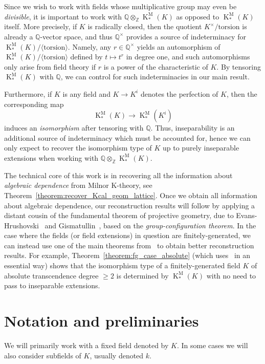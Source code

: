 \documentclass[12pt]{amsart}
\newcommand{\KM}{\operatorname{K}^\mathrm{M}}
\newcommand{\Zbb}{\mathbb{Z}}
\newcommand{\Qbb}{\mathbb{Q}}
\theoremstyle{definition}
\begin{document}
Since we wish to work with fields whose multiplicative group may even be \emph{divisible}, it is important to work with $\Qbb \otimes_{\Zbb} \KM_{*}(K)$ as opposed to $\KM_{*}(K)$ itself.
More precisely, if $K$ is radically closed, then the quotient $K^{\times}/\mathrm{torsion}$ is already a $\Qbb$-vector space, and thus $\Qbb^{\times}$ provides a source of indeterminacy for $\KM_{*}(K)/\langle \text{torsion} \rangle$.
Namely, any $r \in \Qbb^{\times}$ yields an automorphism of $\KM_{*}(K)/\langle \mathrm{torsion} \rangle$ defined by $t \mapsto t^{r}$ in degree one, and such automorphisms only arise from field theory if $r$ is a power of the characteristic of $K$.
By tensoring $\KM_{*}(K)$ with $\Qbb$, we can control for such indeterminacies in our main result.

Furthermore, if $K$ is any field and $K \to K^{i}$ denotes the perfection of $K$, then the corresponding map
\[ \KM_{*}(K) \to \KM_{*}(K^{i}) \]
induces an \emph{isomorphism} after tensoring with $\Qbb$.
Thus, inseparability is an additional source of indeterminacy which must be accounted for, hence we can only expect to recover the isomorphism type of $K$ up to purely inseparable extensions when working with $\Qbb \otimes_{\Zbb} \KM_{*}(K)$.

The technical core of this work is in recovering all the information about \emph{algebraic dependence} from Milnor K-theory, see Theorem~\ref{theorem:recover_Kcal_geom_lattice}.
Once we obtain all information about algebraic dependence, our reconstruction results will follow by applying a distant cousin of the fundamental theorem of projective geometry, due to Evans-Hrushovski~\cite{zbMATH00007333,zbMATH00839199} and Gismatullin~\cite{zbMATH05350217}, based on the \emph{group-configuration theorem}.
In the case where the fields (or field extensions) in question are finitely-generated, we can instead use one of the main theorems from~\cite{zbMATH07463742} to obtain better reconstruction results.
For example, Theorem~\ref{theorem:fg_case_absolute} (which uses~\cite[Theorem 4]{zbMATH07463742} in an essential way) shows that the isomorphism type of a finitely-generated field $K$ of absolute transcendence degree $\geq 2$ is determined by $\KM_{*}(K)$ with no need to pass to inseparable extensions.

\section{Notation and preliminaries}

We will primarily work with a fixed field denoted by $K$.
In some cases we will also consider subfields of $K$, usually denoted $k$.
\end{document}
